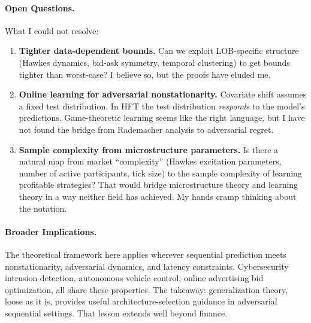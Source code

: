 \documentclass[11pt]{article}
\theoremstyle{definition}
\theoremstyle{remark}
\begin{document}
\paragraph{Open Questions.}
What I could not resolve:
\begin{enumerate}
    \item \textbf{Tighter data-dependent bounds.}  Can we exploit LOB-specific structure (Hawkes dynamics, bid-ask symmetry, temporal clustering) to get bounds tighter than worst-case?  I believe so, but the proofs have eluded me.

    \item \textbf{Online learning for adversarial nonstationarity.}  Covariate shift assumes a fixed test distribution.  In HFT the test distribution \emph{responds} to the model's predictions.  Game-theoretic learning seems like the right language, but I have not found the bridge from Rademacher analysis to adversarial regret.

    \item \textbf{Sample complexity from microstructure parameters.}  Is there a natural map from market ``complexity'' (Hawkes excitation parameters, number of active participants, tick size) to the sample complexity of learning profitable strategies?  That would bridge microstructure theory and learning theory in a way neither field has achieved.  My hands cramp thinking about the notation.
\end{enumerate}

\paragraph{Broader Implications.}
The theoretical framework here applies wherever sequential prediction meets nonstationarity, adversarial dynamics, and latency constraints.
Cybersecurity intrusion detection, autonomous vehicle control, online advertising bid optimization, all share these properties.
The takeaway: generalization theory, loose as it is, provides useful architecture-selection guidance in adversarial sequential settings.
That lesson extends well beyond finance.




\end{document}
